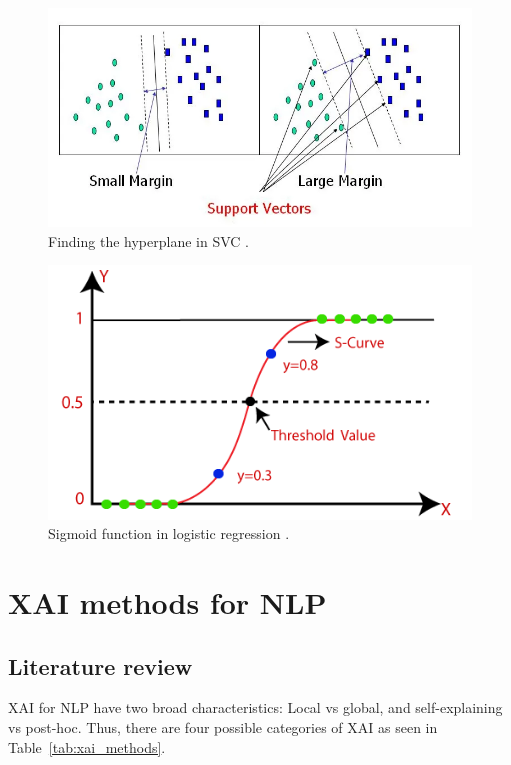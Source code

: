 \begin{figure}[!ht]
	\centering
	\includegraphics[width=1\linewidth]{figures/svc_viz.png}
	\caption{Finding the hyperplane in SVC \cite{svc_viz}.}   
    \label{fig:svc_viz}
\end{figure}

\begin{figure}[!ht]
	\centering
	\includegraphics[width=1\linewidth]{figures/logistic_reg.png}
	\caption{Sigmoid function in logistic regression \cite{log_reg_viz}.}   
    \label{fig:log_reg_viz}
\end{figure}


\section{XAI methods for NLP}
\subsection{Literature review}
XAI for NLP have two broad characteristics: Local vs global, and self-explaining vs post-hoc. Thus, there are four possible categories of XAI as seen in Table~\ref{tab:xai_methods}.

